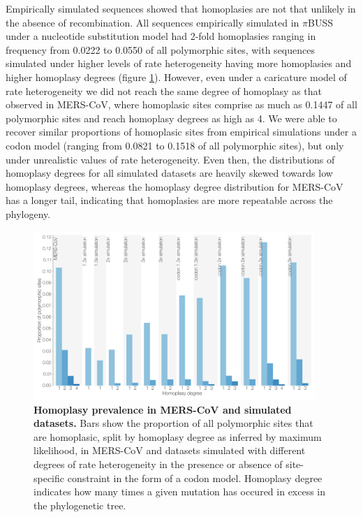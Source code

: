 \documentclass[11pt,oneside,letterpaper]{article}
\begin{document}
Empirically simulated sequences showed that homoplasies are not that unlikely in the absence of recombination.
All sequences empirically simulated in $\pi$BUSS under a nucleotide substitution model had 2-fold homoplasies ranging in frequency from 0.0222 to 0.0550 of all polymorphic sites, with sequences simulated under higher levels of rate heterogeneity having more homoplasies and higher homoplasy degrees (figure \ref{homoplasy_control}).
However, even under a caricature model of rate heterogeneity we did not reach the same degree of homoplasy as that observed in MERS-CoV, where homoplasic sites comprise as much as 0.1447 of all polymorphic sites and reach homoplasy degrees as high as 4.
We were able to recover similar proportions of homoplasic sites from empirical simulations under a codon model (ranging from 0.0821 to 0.1518 of all polymorphic sites), but only under unrealistic values of rate heterogeneity. 
Even then, the distributions of homoplasy degrees for all simulated datasets are heavily skewed towards low homoplasy degrees, whereas the homoplasy degree distribution for MERS-CoV has a longer tail, indicating that homoplasies are more repeatable across the phylogeny.

\begin{figure}[h!]
	\centering
	\includegraphics[width=0.95\textwidth]{figures/MERS_homoplasy_control.png}
	\caption{\textbf{Homoplasy prevalence in MERS-CoV and simulated datasets.}
Bars show the proportion of all polymorphic sites that are homoplasic, split by homoplasy degree as inferred by maximum likelihood, in MERS-CoV and datasets simulated with different degrees of rate heterogeneity in the presence or absence of site-specific constraint in the form of a codon model.
Homoplasy degree indicates how many times a given mutation has occured in excess in the phylogenetic tree.}
	\label{homoplasy_control}
\end{figure}
\end{document}
